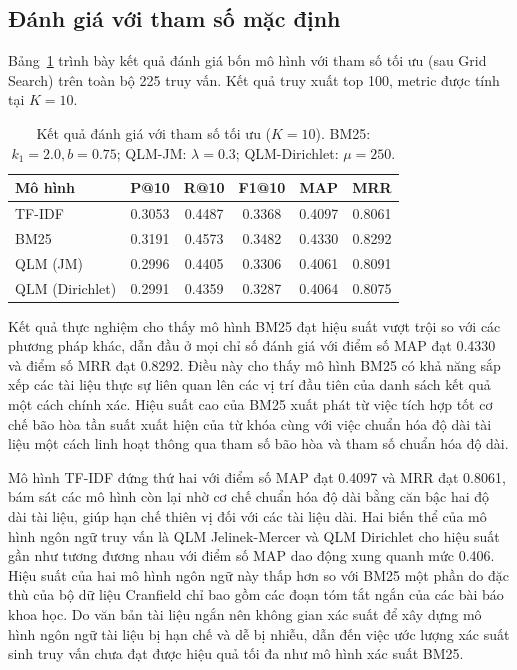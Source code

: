 \documentclass[12pt,a4paper,twoside]{article}
\begin{document}
\subsection{Đánh giá với tham số mặc định}

Bảng~\ref{tab:baseline} trình bày kết quả đánh giá bốn mô hình với tham số tối ưu (sau Grid Search) trên toàn bộ 225 truy vấn. Kết quả truy xuất top 100, metric được tính tại $K = 10$.

\begin{table}[H]
\centering
\begin{tabular}{lccccc}
\toprule
\textbf{Mô hình} & \textbf{P@10} & \textbf{R@10} & \textbf{F1@10} & \textbf{MAP} & \textbf{MRR} \\
\midrule
TF-IDF             & 0.3053 & 0.4487 & 0.3368 & 0.4097 & 0.8061 \\
BM25               & 0.3191 & 0.4573 & 0.3482 & 0.4330 & 0.8292 \\
QLM (JM)           & 0.2996 & 0.4405 & 0.3306 & 0.4061 & 0.8091 \\
QLM (Dirichlet)    & 0.2991 & 0.4359 & 0.3287 & 0.4064 & 0.8075 \\
\bottomrule
\end{tabular}
\caption{Kết quả đánh giá với tham số tối ưu ($K = 10$). BM25: $k_1 = 2.0, b = 0.75$; QLM-JM: $\lambda = 0.3$; QLM-Dirichlet: $\mu = 250$.}
\label{tab:baseline}
\end{table}

Kết quả thực nghiệm cho thấy mô hình BM25 đạt hiệu suất vượt trội so với các phương pháp khác, dẫn đầu ở mọi chỉ số đánh giá với điểm số MAP đạt 0.4330 và điểm số MRR đạt 0.8292. Điều này cho thấy mô hình BM25 có khả năng sắp xếp các tài liệu thực sự liên quan lên các vị trí đầu tiên của danh sách kết quả một cách chính xác. Hiệu suất cao của BM25 xuất phát từ việc tích hợp tốt cơ chế bão hòa tần suất xuất hiện của từ khóa cùng với việc chuẩn hóa độ dài tài liệu một cách linh hoạt thông qua tham số bão hòa và tham số chuẩn hóa độ dài. 

Mô hình TF-IDF đứng thứ hai với điểm số MAP đạt 0.4097 và MRR đạt 0.8061, bám sát các mô hình còn lại nhờ cơ chế chuẩn hóa độ dài bằng căn bậc hai độ dài tài liệu, giúp hạn chế thiên vị đối với các tài liệu dài. Hai biến thể của mô hình ngôn ngữ truy vấn là QLM Jelinek-Mercer và QLM Dirichlet cho hiệu suất gần như tương đương nhau với điểm số MAP dao động xung quanh mức 0.406. Hiệu suất của hai mô hình ngôn ngữ này thấp hơn so với BM25 một phần do đặc thù của bộ dữ liệu Cranfield chỉ bao gồm các đoạn tóm tắt ngắn của các bài báo khoa học. Do văn bản tài liệu ngắn nên không gian xác suất để xây dựng mô hình ngôn ngữ tài liệu bị hạn chế và dễ bị nhiễu, dẫn đến việc ước lượng xác suất sinh truy vấn chưa đạt được hiệu quả tối đa như mô hình xác suất BM25.
\end{document}
